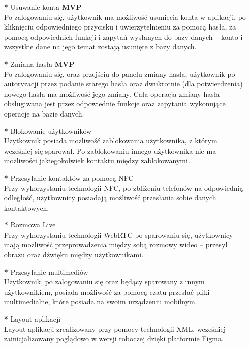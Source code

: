 \documentclass[12pt,a4paper]{article}
\begin{document}
\begin{itemize}
\item [\textbf{*}] Usuwanie konta \textbf{MVP}
\\ 
\newline
Po zalogowaniu się, użytkownik ma możliwość usunięcia konta w aplikacji, po kliknięciu odpowiedniego przycisku i uwierzytelnieniu za pomocą hasła, za pomocą odpowiednich funkcji i zapytań wysłanych do bazy danych – konto i wszystkie dane na jego temat zostają usunięte z bazy danych.
\newline
\item [\textbf{*}] Zmiana hasła \textbf{MVP}
\\ 
\newline
Po zalogowaniu się, oraz przejściu do panelu zmiany hasła, użytkownik po autoryzacji przez podanie starego hasła oraz dwukrotnie (dla potwierdzenia) nowego hasła ma możliwość jego zmiany. Cała operacja zmiany hasła obsługiwana jest przez odpowiednie funkcje oraz zapytania wykonujące operacje na bazie danych.
\newline
\item [\textbf{*}] Blokowanie użytkowników
\\ 
\newline
Użytkownik posiada możliwość zablokowania użytkownika, z którym wcześniej się sparował. Po zablokowaniu innego użytkownika nie ma możliwości jakiegokolwiek kontaktu między zablokowanymi.
\\ 
\newline
\item [\textbf{*}] Przesyłanie kontaktów za pomocą NFC
\\ 
\newline
Przy wykorzystaniu technologii NFC, po zbliżeniu telefonów na odpowiednią odległość, użytkownicy posiadają możliwość przesłania sobie danych kontaktowych.
\newline
\newpage
\item [\textbf{*}] Rozmowa Live
\\ 
\newline
Przy wykorzystaniu technologii WebRTC po sparowaniu się, użytkownicy mają możliwość przeprowadzenia między sobą rozmowy wideo – przesył obrazu oraz dźwięku między użytkownikami.
\newline

\item [\textbf{*}] Przesyłanie multimediów
\\ 
\newline
Użytkownik, po zalogowaniu się oraz będący sparowany z innym użytkownikiem, posiada możliwość za pomocą czatu przesłać pliki multimedialne, które posiada na swoim urządzeniu mobilnym.
\newline
\item [\textbf{*}] Layout aplikacji
\\ 
\newline
Layout aplikacji zrealizowany przy pomocy technologii XML, wcześniej zainicjalizowany poglądowo w wersji roboczej dzięki platformie Figma.
\newline


\end{itemize}
\end{document}
